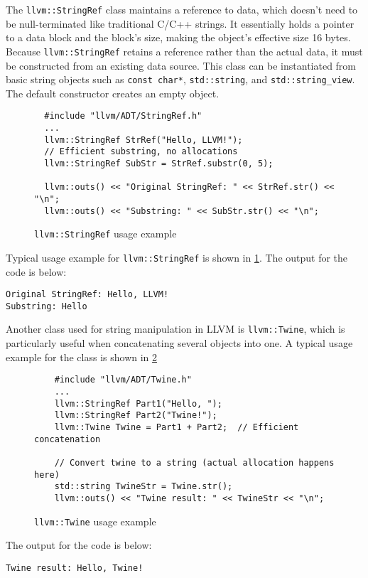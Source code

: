 The \texttt{llvm::StringRef} class maintains a reference to data, which
doesn't need to be null-terminated like traditional C/C++ strings. It
essentially holds a pointer to a data block and the block's size, making the
object's effective size 16 bytes. Because \texttt{llvm::StringRef}
retains a reference rather than the actual data, it must be constructed from an
existing data source. This class can be instantiated from basic string objects
such as \texttt{const char*}, \texttt{std::string}, and
\texttt{std::string_view}. The default constructor creates an empty
object.

\begin{figure}[H]
\begin{verbatim}
  #include "llvm/ADT/StringRef.h"
  ...
  llvm::StringRef StrRef("Hello, LLVM!");
  // Efficient substring, no allocations
  llvm::StringRef SubStr = StrRef.substr(0, 5);  
  
  llvm::outs() << "Original StringRef: " << StrRef.str() << "\n";
  llvm::outs() << "Substring: " << SubStr.str() << "\n";
\end{verbatim}
\caption{\texttt{llvm::StringRef} usage example}
\label{lis:ch4:string_ref_usage}
\end{figure}
Typical usage example for \texttt{llvm::StringRef} is shown in
\cref{lis:ch4:string_ref_usage}. The output for the code is below:
\begin{adjustwidth}{0em}{0em}
\begin{verbatim}
Original StringRef: Hello, LLVM!
Substring: Hello
\end{verbatim}
\end{adjustwidth}

Another class used for string manipulation in LLVM is
\texttt{llvm::Twine}, which is particularly useful when concatenating
several objects into one. A typical usage example for the class is shown in
\cref{lis:ch4:twine_usage} 

\begin{figure}[H]
  \begin{verbatim}
    #include "llvm/ADT/Twine.h"
    ...
    llvm::StringRef Part1("Hello, ");
    llvm::StringRef Part2("Twine!");
    llvm::Twine Twine = Part1 + Part2;  // Efficient concatenation

    // Convert twine to a string (actual allocation happens here)
    std::string TwineStr = Twine.str();
    llvm::outs() << "Twine result: " << TwineStr << "\n";
\end{verbatim}
\caption{\texttt{llvm::Twine} usage example}
\label{lis:ch4:twine_usage}
\end{figure}
The output for the code is below:
\begin{adjustwidth}{0em}{0em}
\begin{verbatim}
Twine result: Hello, Twine!
\end{verbatim}
\end{adjustwidth}


